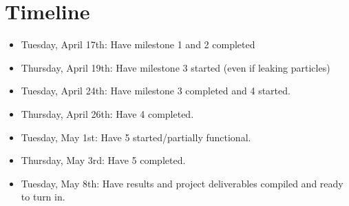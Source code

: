 \documentclass{article}
\begin{document}
\section{Timeline}
\begin{itemize}
  \item Tuesday, April 17th: Have milestone 1 and 2 completed
  \item Thursday, April 19th: Have milestone 3 started (even if leaking particles)
  \item Tuesday, April 24th: Have milestone 3 completed and 4 started. 
  \item Thursday, April 26th: Have 4 completed.
  \item Tuesday, May 1st: Have 5 started/partially functional.
  \item Thursday, May 3rd: Have 5 completed.
  \item Tuesday, May 8th: Have results and project deliverables compiled and ready to turn in.
\end{itemize}
\end{document}
